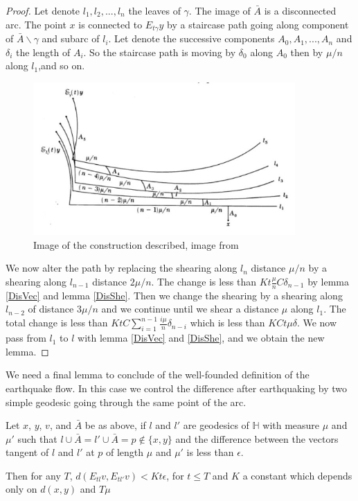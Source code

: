 \begin{proof}
Let denote $l_1,l_2,...,l_n$ the leaves of $\gamma$. The image of $\bar{A}$ is a disconnected arc. The point $x$ is connected to $E_{t \gamma}y$ by a staircase path going along component of $\bar{A} \backslash \gamma$ and subarc of $l_i$. Let denote the successive components $A_0,A_1,...,A_n$ and $\delta_i$ the length of $A_i$. So the staircase path is moving by $\delta_0$ along $A_0$ then by $\mu / n$ along $l_1$,and so on.

\begin{figure}[h!]
\centering
\includegraphics[width=10cm]{Image/ProofEarthquake.jpg}
\caption{Image of the construction described, image from \cite{NielsenRealizationPro}}
\end{figure}

We now alter the path by replacing the shearing along $l_n$ distance $\mu / n$ by a shearing along $l_{n-1}$ distance $2 \mu /n$. The change is less than $Kt \frac{\mu}{n}C \delta_{n-1}$ by lemma \ref{DisVec} and lemma \ref{DisShe}. Then we change the shearing by a shearing along $l_{n-2}$ of distance $3 \mu /n$ and we continue until we shear a distance $\mu$ along $l_1$. The total change is less than $KtC\sum_{i=1}^{n-1}\frac{i \mu}{n} \delta_{n-i}$
 which is less than $KCt \mu \delta$.
 We now pass from $l_1$ to $l$ with lemma \ref{DisVec} and \ref{DisShe}, and we obtain the new lemma.
\end{proof}

We need a final lemma to conclude of the well-founded definition of the earthquake flow. In this case we control the difference after earthquaking by two simple geodesic going through the same point of the arc.

\begin{lem}
Let $x$, $y$, $v$, and $\bar{A}$ be as above, if $l$ and $l'$ are geodesics of $\mathbb{H}$ with measure $\mu$ and $\mu'$ such that $l \cup \bar{A} = l' \cup \bar{A}=p \notin \{x,y\}$ and the difference between the vectors tangent of $l$ and $l'$ at $p$ of length $\mu$ and $\mu'$ is less than
$\epsilon$.

Then for any $T$, $d(E_{t l}v,E_{t l'}v)<Kt \epsilon $, for $t \leq T$ and $K$ a constant which depends only on $d(x,y)$ and $T \mu$
\end{lem}

